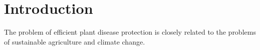 \section{Introduction}
The problem of efficient plant disease protection is closely related to the problems
of sustainable agriculture and climate change. \cite{Authors1}
